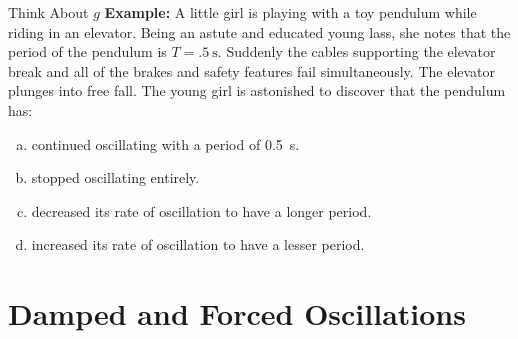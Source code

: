 \documentclass[12pt,compress,aspectratio=169]{beamer}
\begin{document}
\begin{frame}{Think About $g$}
  \textbf{Example:} A little girl is playing with a toy pendulum while riding
  in an elevator. Being an astute and educated young lass, she notes that the 
  period of the pendulum is $T=\SI{.5}{\second}$. Suddenly the cables
  supporting the elevator break and all  of the brakes and safety features fail
  simultaneously. The elevator plunges into free fall. The young girl is
  astonished to discover that the pendulum has:
  \begin{enumerate}[(a)]
  \item continued oscillating with a period of \SI{.5}{\second}.
  \item stopped oscillating entirely.
  \item decreased its rate of oscillation to have a longer period.
  \item increased its rate of oscillation to have a lesser period.
  \end{enumerate}
\end{frame}



\section{Damped and Forced Oscillations}
\end{document}
